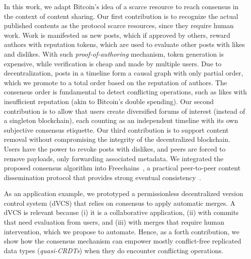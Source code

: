 \documentclass[10pt,journal,compsoc]{IEEEtran}
\newcommand{\FC}       {Freechains\xspace}
\newcommand{\reps}     {\emph{reps}\xspace}
\begin{document}
In this work, we adapt Bitcoin's idea of a scarce resource to reach consensus
in the context of content sharing.
%
Our first contribution is to recognize the actual published contents as the
protocol scarce resources, since they require human work.
%
Work is manifested as new posts, which if approved by others, reward authors
with reputation tokens, which are used to evaluate other posts with likes and
dislikes.
With such \emph{proof-of-authoring} mechanism, token generation is expensive,
while verification is cheap and made by multiple users.
%
Due to decentralization, posts in a timeline form a causal graph with only
partial order, which we promote to a total order based on the reputation of
authors.
The consensus order is fundamental to detect conflicting operations, such as
likes with insufficient reputation (akin to Bitcoin's double spending).
%
Our second contribution is to allow that users create diversified forums of
interest (instead of a singleton blockchain), each counting as an independent
timeline with its own subjective consensus etiquette.
%
Our third contribution is to support content removal without compromising the
integrity of the decentralized blockchain.
Users have the power to revoke posts with dislikes, and peers are forced to
remove payloads, only forwarding associated metadata.
%
We integrated the proposed consensus algorithm into \FC~\cite{fcs.sbseg20}, a
practical peer-to-peer content dissemination protocol that provides strong
eventual consistency~\cite{p2p.crdts,p2p.sec}.

As an application example, we prototyped a permissionless decentralized version
control system (dVCS) that relies on consensus to apply automatic merges.
A dVCS is relevant because
    (i)   it is a collaborative application,
    (ii)  with commits that need evaluation from users, and
    (iii) with merges that require human intervention, which we propose to
          automate.
%
Hence, as a forth contribution, we show how the consensus mechanism can empower
mostly conflict-free replicated data types (\emph{quasi-CRDTs}) when they do
encounter conflicting operations.
\end{document}

